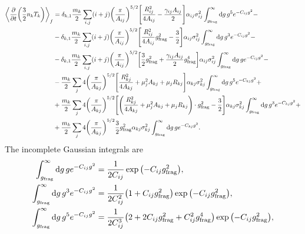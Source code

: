 \documentclass[aps,prl,preprint,groupedaddress,10pt]{revtex4-2}
\begin{document}
\begin{equation}
    \begin{split}
        \avg{\pdv{t}\pqty{\frac{3}{2}n_kT_k}}_f&=\delta_{k,1}\frac{m_k}{2}
        \sum_{i,j}(i+j)\pqty{\frac{\pi}{A_{ij}}}^{5/2}
        \bqty{\frac{R_{ij}^2}{4A_{ij}}-\frac{\gamma_{ij}A_{ij}}{2}}
        \alpha_{ij}\sigma_{ij}^2\int_{\ltx{g}{frag}}^{\infty}
        \dd{g}g^5e^{-C_{ij}g^2}-\\
        &-\delta_{k,1}\frac{m_k}{2}
        \sum_{i,j}(i+j)\pqty{\frac{\pi}{A_{ij}}}^{5/2}
        \bqty{\frac{R_{ij}^2}{4A_{ij}}\ltx{g}{frag}^2-\frac{3}{2}}
        \alpha_{ij}\sigma_{ij}^2
        \int_{\ltx{g}{frag}}^{\infty}
        \dd{g}g^3e^{-C_{ij}g^2}-\\
        &-\delta_{k,1}\frac{m_k}{2}
        \sum_{i,j}(i+j)\pqty{\frac{\pi}{A_{ij}}}^{5/2}
        \bqty{\frac{3}{2}\ltx{g}{frag}^2+\frac{\gamma_{ij}A_{ij}}{2}\ltx{g}{frag}^4}
        \alpha_{ij}\sigma_{ij}^2
        \int_{\ltx{g}{frag}}^{\infty}\dd{g}ge^{-C_{ij}g^2}-\\
        &-\frac{m_k}{2}\sum_{j}4\pqty{\frac{\pi}{A_{kj}}}^{5/2}
        \bqty{\frac{R_{kj}^2}{4A_{kj}}+\mu_j^2A_{kj}+\mu_jR_{kj}}
        \alpha_{kj}\sigma_{kj}^2\int_{\ltx{g}{frag}}^{\infty}
        \dd{g}g^5 e^{-C_{kj}g^2}+\\
        &+\frac{m_k}{2}\sum_{j}4\pqty{\frac{\pi}{A_{kj}}}^{5/2}
        \bqty{\pqty{\frac{R_{kj}^2}{4A_{kj}}+\mu_j^2A_{kj}+\mu_jR_{kj}}\cdot\ltx{g}{frag}^2
        -\frac{3}{2}}
        \alpha_{kj}\sigma_{kj}^2\int_{\ltx{g}{frag}}^{\infty}
        \dd{g}g^3e^{-C_{kj}g^2}+\\
        &+\frac{m_k}{2}\sum_{j}4\pqty{\frac{\pi}{A_{kj}}}^{5/2}
        \frac{3}{2}\ltx{g}{frag}^2\alpha_{kj}
        \sigma_{kj}^2\int_{\ltx{g}{frag}}^{\infty}
        \dd{g}ge^{-C_{kj}g^2}.
    \end{split}
\end{equation}
The incomplete Gaussian integrals are
\begin{equation}
    \begin{split}
        \int_{\ltx{g}{frag}}^{\infty}\dd{g}g e^{-C_{ij}g^2}&=
        \frac{1}{2C_{ij}}\exp\pqty{-C_{ij}\ltx{g}{frag}^2},\\
        \int_{\ltx{g}{frag}}^{\infty}\dd{g}g^3 e^{-C_{ij}g^2}&=
        \frac{1}{2C_{ij}^2}\pqty{1+C_{ij}\ltx{g}{frag}^2}\exp\pqty{-C_{ij}\ltx{g}{frag}^2},\\
        \int_{\ltx{g}{frag}}^{\infty}\dd{g}g^5 e^{-C_{ij}g^2}&=
        \frac{1}{2C_{ij}^3}\pqty{2+2C_{ij}\ltx{g}{frag}^2+C_{ij}^2\ltx{g}{frag}^4}
        \exp\pqty{-C_{ij}\ltx{g}{frag}^2},
    \end{split}
\end{equation}
\end{document}
